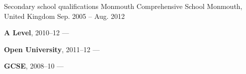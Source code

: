 \begin{cventries}
    \cventry
        {Secondary school qualifications}
        {Monmouth Comprehensive School}
        {Monmouth, United Kingdom}
        {Sep. 2005 -- Aug. 2012}
        {
        \begin{cvitems}
            \item {\textbf{A Level}, 2010--12 --- }
            \vpaddingEduNorm
            \item {\textbf{Open University}, 2011--12 --- }
            \vpaddingEduNorm
            \item {\textbf{GCSE}, 2008--10 --- }
        \end{cvitems}
        }
\end{cventries}
